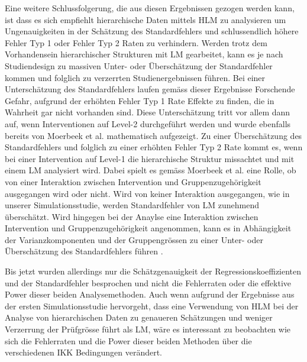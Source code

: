 \documentclass[12pt]{article}\usepackage[]{graphicx}\usepackage[]{color}
\begin{document}
Eine weitere Schlussfolgerung, die aus diesen Ergebnissen gezogen werden kann, ist dass es sich empfiehlt hierarchische Daten mittels HLM zu analysieren um Ungenauigkeiten in der Schätzung des Standardfehlers und schlussendlich höhere Fehler Typ 1 oder Fehler Typ 2 Raten zu verhindern. Werden trotz dem Vorhandensein hierarchischer Strukturen mit LM gearbeitet, kann es je nach Studiendesign zu massiven Unter- oder Überschätzung der Standardfehler kommen und folglich zu verzerrten Studienergebnissen führen. Bei einer Unterschätzung des Standardfehlers laufen gemäss dieser Ergebnisse Forschende Gefahr, aufgrund der erhöhten Fehler Typ 1 Rate Effekte zu finden, die in Wahrheit gar nicht vorhanden sind. Diese Unterschätzung tritt vor allem dann auf, wenn Interventionen auf Level-2 durchgeführt werden und wurde ebenfalls bereits von Moerbeek et al. \citeyearpar{MOERBEEK2003341} mathematisch aufgezeigt. Zu einer Überschätzung des Standardfehlers und folglich zu einer erhöhten Fehler Typ 2 Rate kommt es, wenn bei einer Intervention auf Level-1 die hierarchische Struktur missachtet und mit einem LM analysiert wird. Dabei spielt es gemäss Moerbeek et al. \citeyearpar{MOERBEEK2003341} eine Rolle, ob von einer Interaktion zwischen Intervention und Gruppenzugehörigkeit ausgegangen wird oder nicht. Wird von keiner Interaktion ausgegangen, wie in unserer Simulationsstudie, werden Standardfehler von LM zunehmend überschätzt. Wird hingegen bei der Anaylse eine Interaktion zwischen Intervention und Gruppenzugehörigkeit angenommen, kann es in Abhängigkeit der Varianzkomponenten und der Gruppengrössen zu einer Unter- oder Überschätzung des Standardfehlers führen \citep{MOERBEEK2003341}. 

Bis jetzt wurden allerdings nur die Schätzgenauigkeit der Regressionskoeffizienten und der Standardfehler besprochen und nicht die Fehlerraten oder die effektive Power dieser beiden Analysemethoden. Auch wenn aufgrund der Ergebnisse aus der ersten Simulationsstudie hervorgeht, dass eine Verwendung von HLM bei der Analyse von hierarchischen Daten zu genaueren Schätzungen und weniger Verzerrung der Prüfgrösse führt als LM, wäre es interessant zu beobachten wie sich die Fehlerraten und die Power dieser beiden Methoden über die verschiedenen IKK Bedingungen verändert. 
\end{document}
